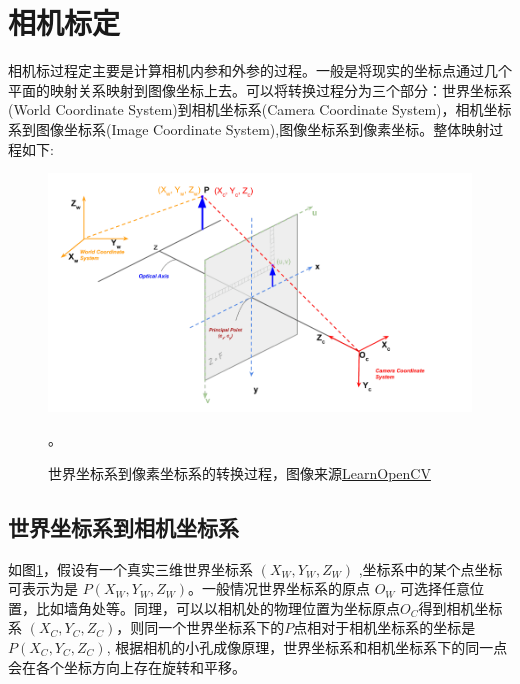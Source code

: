 \documentclass[12pt]{book}
\begin{document}
\section{相机标定}
相机标过程定主要是计算相机内参和外参的过程。一般是将现实的坐标点通过几个平面的映射关系映射到图像坐标上去\cite{computevision}。可以将转换过程分为三个部分：世界坐标系(World Coordinate System)到相机坐标系(Camera Coordinate System)，相机坐标系到图像坐标系(Image Coordinate System),图像坐标系到像素坐标。整体映射过程如下:
\begin{figure}[H] %
	\centering %
	\includegraphics[width=1.0\textwidth]{images/camera-projection-3D-to-2D.png} %
	\caption{世界坐标系到像素坐标系的转换过程，图像来源\href{https://learnopencv.com/geometry-of-image-formation}{LearnOpenCV}}。 %
	\label{camera-projection-3D-to-2D} %
\end{figure}

\subsection{世界坐标系到相机坐标系}
如图\ref{camera-projection-3D-to-2D}，假设有一个真实三维世界坐标系 $({X_W},{Y_W},{Z_W})$ ,坐标系中的某个点坐标可表示为是 $P({X_W},{Y_W},{Z_W})$。一般情况世界坐标系的原点 $O_W$ 可选择任意位置，比如墙角处等。同理，可以以相机处的物理位置为坐标原点$O_C$得到相机坐标系 $({X_C},{Y_C},{Z_C})$，则同一个世界坐标系下的$P$点相对于相机坐标系的坐标是 $P({X_C},{Y_C},{Z_C})$, 根据相机的小孔成像原理，世界坐标系和相机坐标系下的同一点会在各个坐标方向上存在旋转和平移。
\end{document}
